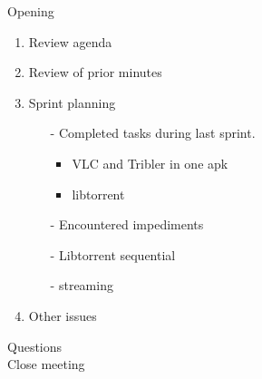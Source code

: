 \documentclass[pdftex, 12pt, a4paper]{report}
\begin{document}
\pagestyle{fancy}

Opening

\begin{enumerate}
\item Review agenda			
\item Review of prior minutes
\item Sprint planning
\begin{enumerate}
\item[-] Completed tasks during last sprint.
	\begin{itemize}
	\item VLC and Tribler in one apk
	\item libtorrent
	\end{itemize}
\item[-] Encountered impediments
\item[-] Libtorrent sequential
\item[-] streaming
\end{enumerate}
\item Other issues
\end{enumerate}

Questions\\

Close meeting
\end{document}

